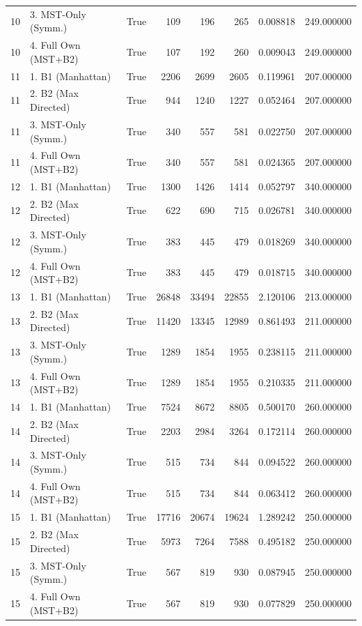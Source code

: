 \begin{table}[htbp]
\begin{tabular}{rlrrrrrr}
10 & 3. MST-Only (Symm.) & True & 109 & 196 & 265 & 0.008818 & 249.000000 \\
10 & 4. Full Own (MST+B2) & True & 107 & 192 & 260 & 0.009043 & 249.000000 \\
11 & 1. B1 (Manhattan) & True & 2206 & 2699 & 2605 & 0.119961 & 207.000000 \\
11 & 2. B2 (Max Directed) & True & 944 & 1240 & 1227 & 0.052464 & 207.000000 \\
11 & 3. MST-Only (Symm.) & True & 340 & 557 & 581 & 0.022750 & 207.000000 \\
11 & 4. Full Own (MST+B2) & True & 340 & 557 & 581 & 0.024365 & 207.000000 \\
12 & 1. B1 (Manhattan) & True & 1300 & 1426 & 1414 & 0.052797 & 340.000000 \\
12 & 2. B2 (Max Directed) & True & 622 & 690 & 715 & 0.026781 & 340.000000 \\
12 & 3. MST-Only (Symm.) & True & 383 & 445 & 479 & 0.018269 & 340.000000 \\
12 & 4. Full Own (MST+B2) & True & 383 & 445 & 479 & 0.018715 & 340.000000 \\
13 & 1. B1 (Manhattan) & True & 26848 & 33494 & 22855 & 2.120106 & 213.000000 \\
13 & 2. B2 (Max Directed) & True & 11420 & 13345 & 12989 & 0.861493 & 211.000000 \\
13 & 3. MST-Only (Symm.) & True & 1289 & 1854 & 1955 & 0.238115 & 211.000000 \\
13 & 4. Full Own (MST+B2) & True & 1289 & 1854 & 1955 & 0.210335 & 211.000000 \\
14 & 1. B1 (Manhattan) & True & 7524 & 8672 & 8805 & 0.500170 & 260.000000 \\
14 & 2. B2 (Max Directed) & True & 2203 & 2984 & 3264 & 0.172114 & 260.000000 \\
14 & 3. MST-Only (Symm.) & True & 515 & 734 & 844 & 0.094522 & 260.000000 \\
14 & 4. Full Own (MST+B2) & True & 515 & 734 & 844 & 0.063412 & 260.000000 \\
15 & 1. B1 (Manhattan) & True & 17716 & 20674 & 19624 & 1.289242 & 250.000000 \\
15 & 2. B2 (Max Directed) & True & 5973 & 7264 & 7588 & 0.495182 & 250.000000 \\
15 & 3. MST-Only (Symm.) & True & 567 & 819 & 930 & 0.087945 & 250.000000 \\
15 & 4. Full Own (MST+B2) & True & 567 & 819 & 930 & 0.077829 & 250.000000 \\

\end{tabular}
\end{table}
